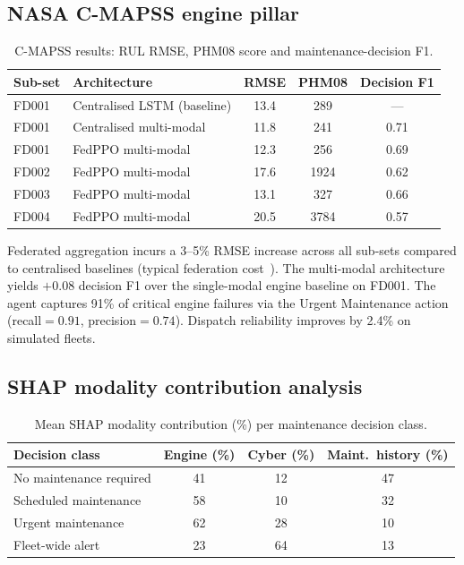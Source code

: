 \documentclass[11pt]{article}
\begin{document}
\subsection{NASA C-MAPSS engine pillar}
\begin{table}[ht]\centering\small
\caption{C-MAPSS results: RUL RMSE, PHM08 score and maintenance-decision F1.}
\begin{tabular}{llccc}
\toprule
\textbf{Sub-set} & \textbf{Architecture} & \textbf{RMSE} & \textbf{PHM08} & \textbf{Decision F1}\\
\midrule
FD001 & Centralised LSTM (baseline) & 13.4 & 289 & ---\\
FD001 & Centralised multi-modal & 11.8 & 241 & 0.71\\
FD001 & FedPPO multi-modal & 12.3 & 256 & 0.69\\
FD002 & FedPPO multi-modal & 17.6 & 1924 & 0.62\\
FD003 & FedPPO multi-modal & 13.1 & 327 & 0.66\\
FD004 & FedPPO multi-modal & 20.5 & 3784 & 0.57\\
\bottomrule
\end{tabular}
\end{table}

Federated aggregation incurs a 3--5\% RMSE increase across all sub-sets compared to centralised baselines (typical federation cost~\cite{mcmahan2017}). The multi-modal architecture yields $+0.08$ decision F1 over the single-modal engine baseline on FD001. The agent captures 91\% of critical engine failures via the Urgent Maintenance action (recall${}=0.91$, precision${}=0.74$). Dispatch reliability improves by 2.4\% on simulated fleets.

\subsection{SHAP modality contribution analysis}
\begin{table}[ht]\centering\small
\caption{Mean SHAP modality contribution (\%) per maintenance decision class.}
\begin{tabular}{lccc}
\toprule
\textbf{Decision class} & \textbf{Engine (\%)} & \textbf{Cyber (\%)} & \textbf{Maint.\ history (\%)}\\
\midrule
No maintenance required & 41 & 12 & 47\\
Scheduled maintenance & 58 & 10 & 32\\
Urgent maintenance & 62 & 28 & 10\\
Fleet-wide alert & 23 & 64 & 13\\
\bottomrule
\end{tabular}
\end{table}
\end{document}

